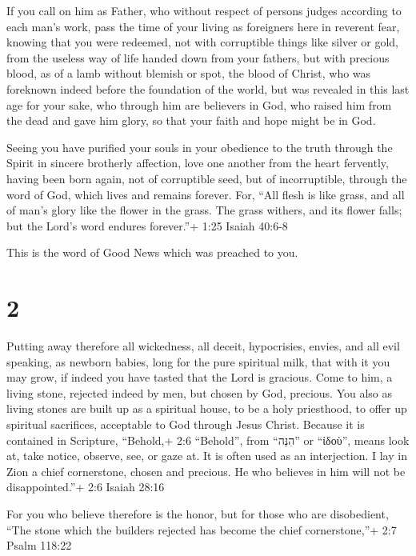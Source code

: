  If you call on him as Father, who without respect of
persons judges according to each man's work, pass the time of your
living as foreigners here in reverent fear,  knowing that
you were redeemed, not with corruptible things like silver or gold, from
the useless way of life handed down from your fathers,  but
with precious blood, as of a lamb without blemish or spot, the blood of
Christ,  who was foreknown indeed before the foundation of
the world, but was revealed in this last age for your sake,
 who through him are believers in God, who raised him from
the dead and gave him glory, so that your faith and hope might be in
God.

 Seeing you have purified your souls in your obedience to
the truth through the Spirit in sincere brotherly affection, love one
another from the heart fervently,  having been born again,
not of corruptible seed, but of incorruptible, through the word of God,
which lives and remains forever.  For, ``All flesh is like
grass, and all of man's glory like the flower in the grass. The grass
withers, and its flower falls;  but the Lord's word endures
forever.''+ 1:25 Isaiah 40:6-8

This is the word of Good News which was preached to you.

\hypertarget{section-1}{%
\section{2}\label{section-1}}

 Putting away therefore all wickedness, all deceit,
hypocrisies, envies, and all evil speaking,  as newborn
babies, long for the pure spiritual milk, that with it you may grow,
 if indeed you have tasted that the Lord is gracious.
 Come to him, a living stone, rejected indeed by men, but
chosen by God, precious.  You also as living stones are
built up as a spiritual house, to be a holy priesthood, to offer up
spiritual sacrifices, acceptable to God through Jesus Christ.
 Because it is contained in Scripture, ``Behold,+ 2:6
``Behold'', from ``הִנֵּה'' or ``ἰδοὺ'', means look at, take notice,
observe, see, or gaze at. It is often used as an interjection. I lay in
Zion a chief cornerstone, chosen and precious. He who believes in him
will not be disappointed.''+ 2:6 Isaiah 28:16

 For you who believe therefore is the honor, but for those
who are disobedient, ``The stone which the builders rejected has become
the chief cornerstone,''+ 2:7 Psalm 118:22

